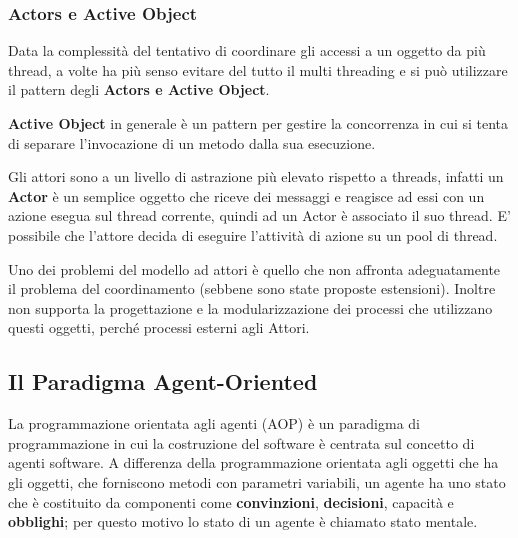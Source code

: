 \subsubsection{Actors e Active Object}
Data la complessità del tentativo di coordinare gli accessi a un oggetto da più thread, a volte ha più senso evitare del tutto il multi threading e si può utilizzare il pattern degli \textbf{Actors e Active Object}. 

\textbf{Active Object} in generale è un pattern per gestire la concorrenza in cui si tenta di separare l'invocazione di un metodo dalla sua esecuzione.

Gli attori sono a un livello di astrazione più elevato rispetto a threads, infatti un \textbf{Actor} è un semplice oggetto che riceve dei messaggi e reagisce ad essi con un azione esegua sul thread corrente, quindi ad un Actor è associato il suo thread. E' possibile che l'attore decida di eseguire l'attività di azione su un pool di thread.

Uno dei problemi del modello ad attori è quello che non affronta adeguatamente il problema del coordinamento (sebbene sono state proposte estensioni). Inoltre non supporta la progettazione e la modularizzazione dei processi che utilizzano questi oggetti, perché processi esterni agli Attori.

\subsection{Il Paradigma Agent-Oriented}
La programmazione orientata agli agenti (AOP) è un paradigma di programmazione in cui la costruzione del software è centrata sul concetto di agenti software. A differenza della programmazione orientata agli oggetti che ha gli oggetti, che forniscono metodi con parametri variabili, un agente ha uno stato che è costituito da componenti come \textbf{convinzioni}, \textbf{decisioni}, capacità e \textbf{obblighi}; per questo motivo lo stato di un agente è chiamato stato mentale.

